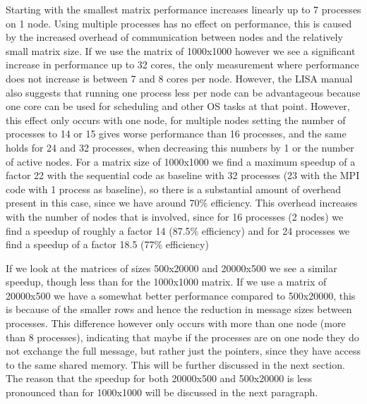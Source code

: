 \documentclass[11pt,a4paper,onecolumn]{article}
\begin{document}
Starting with the smallest matrix performance increases linearly up to 7 processes on 1 node. Using multiple processes has no effect on performance, this is caused by the increased overhead of communication between nodes and the relatively small matrix size. If we use the matrix of 1000x1000 however we see a significant increase in performance up to 32 cores, the only measurement where performance does not increase is between 7 and 8 cores per node. However, the LISA manual also suggests that running one process less per node can be advantageous because one core can be used for scheduling and other OS tasks at that point. However, this effect only occurs with one node, for multiple nodes setting the number of processes to 14 or 15 gives worse performance than 16 processes, and the same holds for 24 and 32 processes, when decreasing this numbers by 1 or the number of active nodes. For a matrix size of 1000x1000 we find a maximum speedup of a factor 22 with the sequential code as baseline with 32 processes (23 with the MPI code with 1 process as baseline), so there is a substantial amount of overhead present in this case, since we have around 70\% efficiency. This overhead increases with the number of nodes that is involved, since for 16 processes (2 nodes) we find a speedup of roughly a factor 14 (87.5\% efficiency) and for 24 processes we find a speedup of a factor 18.5 (77\% efficiency)

If we look at the matrices of sizes 500x20000 and 20000x500 we see a similar speedup, though less than for the 1000x1000 matrix. If we use a matrix of 20000x500 we have a somewhat better performance compared to 500x20000, this is because of the smaller rows and hence the reduction in message sizes between processes. This difference however only occurs with more than one node (more than 8 processes), indicating that maybe if the processes are on one node they do not exchange the full message, but rather just the pointers, since they have access to the same shared memory. This will be further discussed in the next section. The reason that the speedup for both 20000x500 and 500x20000 is less pronounced than for 1000x1000 will be discussed in the next paragraph.
\end{document}
